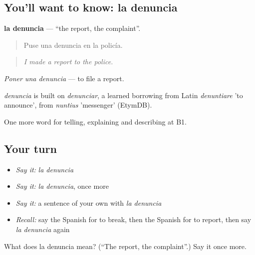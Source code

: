 \subsection*{You'll want to know: la denuncia}
\textbf{la denuncia} — \textquotedblleft{}the report, the complaint\textquotedblright{}.

\begin{quote}
Puse una denuncia en la policía.
\end{quote}

\begin{quote}
\emph{I made a report to the police.}
\end{quote}

\emph{Poner una denuncia} — to file a report.

\begin{cousinweb}
\emph{denuncia} is built on \emph{denunciar}, a learned borrowing from Latin \emph{denuntiare} 'to announce', from \emph{nuntius} 'messenger' (EtymDB).
\end{cousinweb}

\begin{grammarlens}[title={What you've built}]
One more word for telling, explaining and describing at B1.
\end{grammarlens}

\subsection*{Your turn}
\begin{itemize}
\raggedright
  \item \emph{Say it:} \emph{la denuncia}
  \item \emph{Say it:} \emph{la denuncia}, once more
  \item \emph{Say it:} a sentence of your own with \emph{la denuncia}
  \item \emph{Recall:} say the Spanish for to break, then the Spanish for to report, then say \emph{la denuncia} again
\end{itemize}

\begin{tcolorbox}[breakable,colback=teal!4,colframe=teal!35!black,title={Before you move on}]
What does la denuncia mean? (\textquotedblleft{}The report, the complaint\textquotedblright{}.) Say it once more.
\end{tcolorbox}
